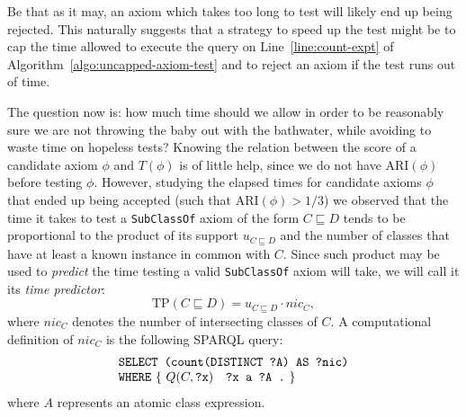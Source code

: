 \documentclass{sig-alternate}
\begin{document}
Be that as it may, an axiom which takes too long to test will likely end up
being rejected. This naturally suggests that a strategy to speed up the test might
be to cap the time allowed to execute the query on Line~\ref{line:count-expt}
of Algorithm~\ref{algo:uncapped-axiom-test} and to reject an axiom if the test
runs out of time.

The question now is: how much time should we allow in order to be reasonably sure
we are not throwing the baby out with the bathwater, while avoiding to waste
time on hopeless tests?
Knowing the relation between the score of a candidate axiom $\phi$ and $T(\phi)$ is of little help,
since we do not have $\mathrm{ARI}(\phi)$ before testing $\phi$. However,
studying the elapsed times for candidate axioms $\phi$ that ended up being accepted
(such that $\mathrm{ARI}(\phi) > 1/3$)
we observed that the time it takes to test a \texttt{SubClassOf} axiom of the form
$C \sqsubseteq D$ tends to be proportional to the product of its support $u_{C \sqsubseteq D}$
and the number of classes that have at least a known instance in common with $C$. 
Since such product may be used to \textit{predict} the time testing a valid \texttt{SubClassOf} axiom will take,
we will call it its \emph{time predictor}:
\begin{equation}\label{eq:time-predictor}
  \mathrm{TP}(C \sqsubseteq D) = u_{C \sqsubseteq D} \cdot nic_C,
\end{equation}
where $nic_C$ denotes the number of intersecting classes of $C$. 
A computational definition of $nic_C$ is the following SPARQL query:
\begin{equation}\label{eq:query-nic}
  \begin{minipage}[c]{5in}
    \begin{tabbing}
      \quad\=\quad\=\quad\=\kill
      \texttt{SELECT (count(DISTINCT ?A) AS ?nic)}\\
      \texttt{WHERE} \{ $Q(C, \mbox{\tt ?x})$\quad \texttt{?x a ?A .} \}
    \end{tabbing}
  \end{minipage}
\end{equation}
where $A$ represents an atomic class expression.
\end{document}
